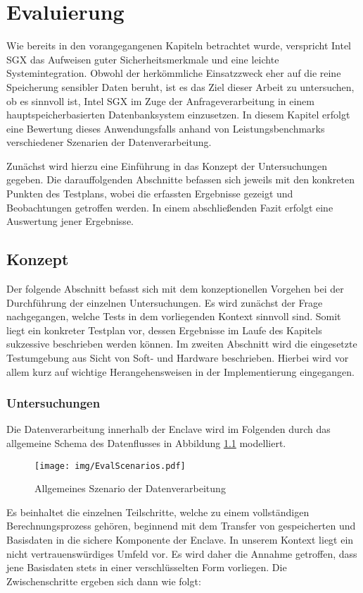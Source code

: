\chapter{Evaluierung}

Wie bereits in den vorangegangenen Kapiteln betrachtet wurde, verspricht Intel SGX das Aufweisen guter Sicherheitsmerkmale und eine leichte Systemintegration. Obwohl der herkömmliche Einsatzzweck eher auf die reine Speicherung sensibler Daten beruht, ist es das Ziel dieser Arbeit zu untersuchen, ob es sinnvoll ist, Intel SGX im Zuge der Anfrageverarbeitung in einem hauptspeicherbasierten Datenbanksystem einzusetzen. In diesem Kapitel erfolgt eine Bewertung dieses Anwendungsfalls anhand von Leistungsbenchmarks verschiedener Szenarien der Datenverarbeitung.

Zunächst wird hierzu eine Einführung in das Konzept der Untersuchungen gegeben. Die darauffolgenden Abschnitte befassen sich jeweils mit den konkreten Punkten des Testplans, wobei die erfassten Ergebnisse gezeigt und Beobachtungen getroffen werden. In einem abschließenden Fazit erfolgt eine Auswertung jener Ergebnisse.

\section{Konzept}

Der folgende Abschnitt befasst sich mit dem konzeptionellen Vorgehen bei der Durchführung der einzelnen Untersuchungen. Es wird zunächst der Frage nachgegangen, welche Tests in dem vorliegenden Kontext sinnvoll sind. Somit liegt ein konkreter Testplan vor, dessen Ergebnisse im Laufe des Kapitels sukzessive beschrieben werden können. Im zweiten Abschnitt wird die eingesetzte Testumgebung aus Sicht von Soft- und Hardware beschrieben. Hierbei wird vor allem kurz auf wichtige Herangehensweisen in der Implementierung eingegangen.

\subsection{Untersuchungen}

Die Datenverarbeitung innerhalb der Enclave wird im Folgenden durch das allgemeine Schema des Datenflusses in Abbildung \ref{fig:scenarios} modelliert.
\begin{figure}[h]
	\texttt{[image: img/EvalScenarios.pdf]}
	\centering
	\caption{Allgemeines Szenario der Datenverarbeitung}
	\label{fig:scenarios}
\end{figure} 
Es beinhaltet die einzelnen Teilschritte, welche zu einem vollständigen Berechnungsprozess gehören, beginnend mit dem Transfer von gespeicherten und Basisdaten in die sichere Komponente der Enclave. In unserem Kontext liegt ein nicht vertrauenswürdiges Umfeld vor. Es wird daher die Annahme getroffen, dass jene Basisdaten stets in einer verschlüsselten Form vorliegen. Die Zwischenschritte ergeben sich dann wie folgt:

